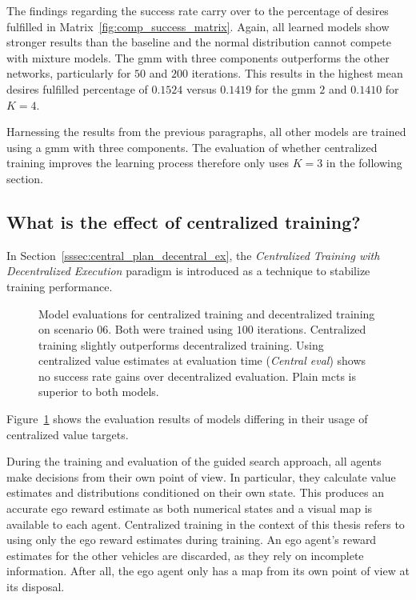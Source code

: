 The findings regarding the success rate carry over to the percentage of desires fulfilled in Matrix~\ref{fig:comp_success_matrix}. Again, all learned models show stronger results than the baseline and the normal distribution cannot compete with mixture models. The \gls{gmm} with three components outperforms the other networks, particularly for $50$ and $200$ iterations. This results in the highest mean desires fulfilled percentage of $0.1524$ versus $0.1419$ for the \gls{gmm} $2$ and $0.1410$ for $K=4$.

Harnessing the results from the previous paragraphs, all other models are trained using a \gls{gmm} with three components. The evaluation of whether centralized training improves the learning process therefore only uses $K=3$ in the following section.

\subsection{What is the effect of centralized training?}\label{ssec:eval_of_centralized_training}
In Section~\ref{sssec:central_plan_decentral_ex}, the \emph{Centralized Training with Decentralized Execution} paradigm is introduced as a technique to stabilize training performance.
\begin{figure}[h]
	\centering
	\captionsetup{justification=centering}
	\scalebox{0.6}{
    
    }
	\caption[Centralized training versus decentralized training]{Model evaluations for centralized training and decentralized training on scenario 06. Both were trained using $100$ iterations. Centralized training slightly outperforms decentralized training. Using centralized value estimates at evaluation time (\emph{Central eval}) shows no success rate gains over decentralized evaluation. Plain \gls{mcts} is superior to both models.}
\label{fig:centralized_decentralized_matrix}
\end{figure}
Figure~\ref{fig:centralized_decentralized_matrix} shows the evaluation results of models differing in their usage of centralized value targets.

During the training and evaluation of the guided search approach, all agents make decisions from their own point of view. In particular, they calculate value estimates and distributions conditioned on their own state. This produces an accurate ego reward estimate as both numerical states and a visual map is available to each agent. Centralized training in the context of this thesis refers to using only the ego reward estimates during training. An ego agent's reward estimates for the other vehicles are discarded, as they rely on incomplete information. After all, the ego agent only has a map from its own point of view at its disposal.

